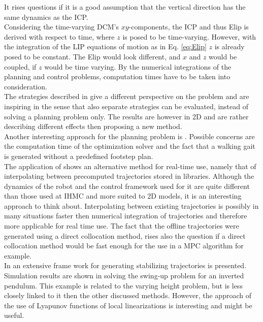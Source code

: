 It rises questions if it is a good assumption that the vertical direction has the same dynamics as the \ac{ICP}. \\
Considering the time-varying \ac{DCM}'s $xy$-components, the \ac{ICP} and thus \ac{Elip} is derived with respect to time, where $z$ is posed to be time-varying. However, with the integration of the \ac{LIP} equations of motion as in Eq. \eqref{eq:Elip} $z$ is already posed to be constant. The \ac{Elip} would look different, and $x$ and $z$ would be coupled, if $z$ would be time varying. By the numerical integrations of the planning and control problems, computation times have to be taken into consideration. \\
The strategies described in \cite{gao2017increase} give a different perspective on the problem and are inspiring in the sense that also separate strategies can be evaluated, instead of solving a planning problem only. The results are however in \ac{2D} and are rather describing different effects then proposing a new method. \\
Another interesting approach for the planning problem is \cite{liu2015trajectory}. Possible concerns are the computation time of the optimization solver and the fact that a walking gait is generated without a predefined footstep plan.\\
The application of \cite{nguyen2017dynamic} shows an alternative method for real-time use, namely that of interpolating between precomputed trajectories stored in libraries. Although the dynamics of the robot and the control framework used for it are quite different than those used at IHMC and more suited to \ac{2D} models, it is an interesting approach to think about. Interpolating between existing trajectories is possibly in many situations faster then numerical integration of trajectories and therefore more applicable for real time use. The fact that the offline trajectories were generated using a direct collocation method, rises also the question if a direct collocation method would be fast enough for the use in a \ac{MPC} algorithm for example. \\
In \cite{tedrake2010lqr} an extensive frame work for generating stabilizing trajectories is presented. Simulation results are shown in solving the swing-up problem for an inverted pendulum. This example is related to the varying height problem, but is less closely linked to it then the other discussed methods. However, the approach of the use of Lyapunov functions of local linearizations is interesting and might be useful.

 

